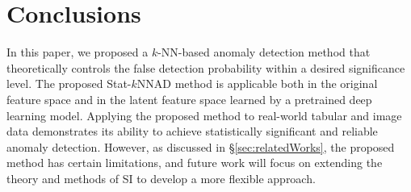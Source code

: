 \section{Conclusions}
\label{sec:conclusions}
%
In this paper, we proposed a $k$-NN-based anomaly detection method that theoretically controls the false detection probability within a desired significance level.
%
The proposed Stat-$k$NNAD method is applicable both in the original feature space and in the latent feature space learned by a pretrained deep learning model.
%
Applying the proposed method to real-world tabular and image data demonstrates its ability to achieve statistically significant and reliable anomaly detection.
%
However, as discussed in \S\ref{sec:relatedWorks}, the proposed method has certain limitations, and future work will focus on extending the theory and methods of SI to develop a more flexible approach.




